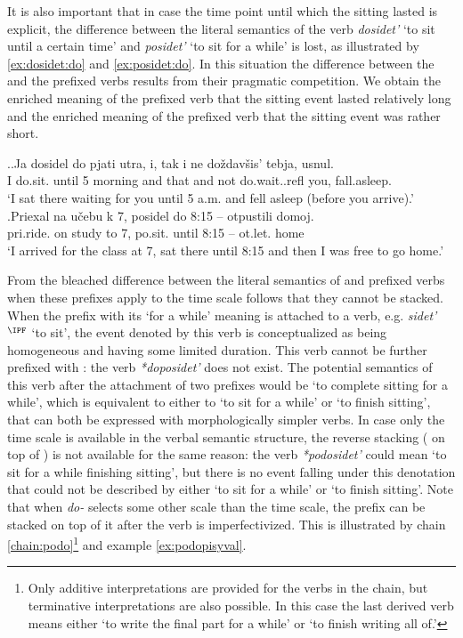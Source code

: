 It is also important that in case the time point until which the sitting lasted is explicit, the difference between the literal semantics of the verb \textit{dosidet'} `to sit until a certain time' and \textit{posidet'} `to sit for a while' is lost, as illustrated by \ref{ex:dosidet:do} and \ref{ex:posidet:do}. In this situation the difference between the  and the prefixed verbs results from their pragmatic competition. We obtain the enriched meaning of the prefixed verb that the sitting event lasted relatively long and the enriched meaning of the prefixed verb that the sitting event was rather short. 

\ex.\ag.\label{ex:dosidet:do}Ja dosidel do pjati utra, i, tak i ne do\v{z}dav\v{s}is' tebja, usnul.\\
I do.sit. until 5 morning and that and not do.wait..refl you, fall.asleep.\\
\trans `I sat there waiting for you until 5 a.m. and fell asleep (before you arrive).'\\
\bg.\label{ex:posidet:do}Priexal na u\v{c}ebu k 7, posidel do 8:15 -- otpustili domoj.\\
pri.ride. on study to 7, po.sit. until 8:15 -- ot.let. home\\
\trans `I arrived for the class at 7, sat there until 8:15 and then I was free to go home.'

From the bleached difference between the literal semantics of  and prefixed verbs when these prefixes apply to the time scale follows that they cannot be stacked. When the prefix  with its `for a while' meaning is attached to a verb, e.g. \textit{sidet'}$^{\IPF}$ `to sit', the event denoted by this verb is conceptualized as being homogeneous and having some limited duration. This verb cannot be further prefixed with : the verb \textit{*doposidet'} does not exist. The potential semantics of this verb after the attachment of two prefixes would be `to complete sitting for a while', which is equivalent to either to `to sit for a while' or `to finish sitting', that can both be expressed with morphologically simpler verbs. In case only the time scale is available in the verbal semantic structure, the reverse stacking ( on top of ) is not available for the same reason: the verb \textit{*podosidet'} could mean `to sit for a while finishing sitting', but there is no event falling under this denotation that could not be described by either `to sit for a while' or `to finish sitting'. Note that when \textit{do-} selects some other scale than the time scale, the prefix  can be stacked on top of it after the verb is imperfectivized. This is illustrated by chain \ref{chain:podo}\footnote{Only additive interpretations are provided for the verbs in the chain, but terminative interpretations are also possible. In this case the last derived verb means either `to write the final part for a while' or `to finish writing all of.'} and example \ref{ex:podopisyval}.

